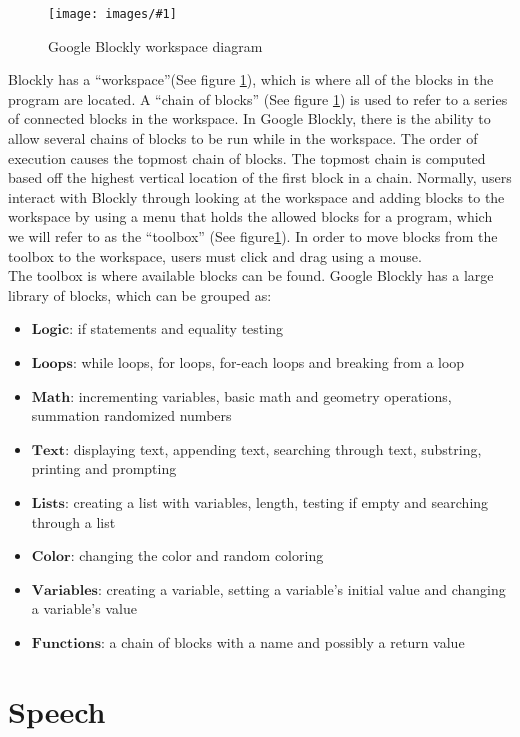 \documentclass[]{article}
\newcommand\fig[3]{
\begin{figure}
  \begin{center}
  \texttt{[image: images/\#1]}
  \caption{#2} 
  \label{fig:#1}
  \end{center}
\end{figure}
}
\begin{document}
\fig{workspaceDiagram.jpg}{Google Blockly workspace diagram}{width=7cm}

Blockly has a ``workspace''(See figure \ref{fig:workspaceDiagram.jpg}), which is where all of the blocks in the program are located. A ``chain of blocks''
(See figure \ref{fig:workspaceDiagram.jpg}) is used to refer to a series of connected blocks in the workspace. In Google Blockly,  
there is the ability to allow several chains of blocks to be run while
in the workspace. The order of execution causes the topmost chain of blocks. The topmost chain
is computed based off the highest vertical location of the first block in a chain. Normally, users interact
with Blockly through looking at the workspace and adding blocks to the workspace by
using a menu that holds the allowed blocks for a program, which we will refer to as the 
``toolbox'' (See figure\ref{fig:workspaceDiagram.jpg}). In order to move blocks from the toolbox to the 
workspace, users must click and drag using a mouse. \\

The toolbox is where available blocks can be found. Google Blockly has a large library of blocks, which can be grouped as:
\begin{itemize}
  \item$\textbf{Logic}$: if statements and equality testing
  \item$\textbf{Loops}$: while loops, for loops, for-each loops and breaking from a loop
  \item$\textbf{Math}$: incrementing variables, basic math and geometry operations, summation randomized numbers
  \item$\textbf{Text}$: displaying text, appending text, searching through text, substring, printing and prompting
  \item$\textbf{Lists}$: creating a list with variables, length, testing if empty and searching through a list
  \item$\textbf{Color}$: changing the color and random coloring
  \item$\textbf{Variables}$: creating a variable, setting a variable's initial value and changing a variable's value
  \item$\textbf{Functions}$: a chain of blocks with a name and possibly a return value
\end{itemize}

\section{Speech}
\end{document}
